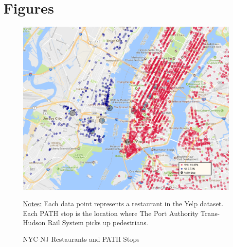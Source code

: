 \documentclass[11pt]{article}
\begin{document}
\section{Figures}

\begin{figure}[H]
\centering
\caption{NYC-NJ Restaurants and PATH Stops}
\includegraphics[width=6in]{pathmap.png}


{\footnotesize \raggedright \underline{Notes:} Each data point represents a restaurant in the Yelp dataset. Each PATH stop is the location where The Port Authority Trans-Hudson Rail System picks up pedestrians.   \par}
\end{figure}
\end{document}
